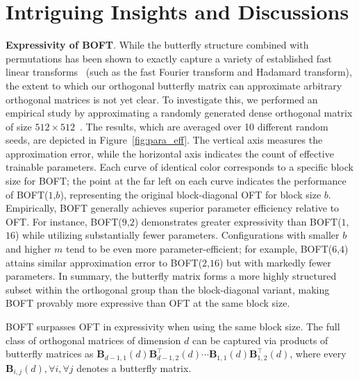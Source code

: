 \section{Intriguing Insights and Discussions}

\textbf{Expressivity of BOFT}. While the butterfly structure combined with permutations has been shown to exactly capture a variety of established fast linear transforms~\cite{dao2019learning,dao2019kaleidoscope} (such as the fast Fourier transform and Hadamard transform), the extent to which our orthogonal butterfly matrix can approximate arbitrary orthogonal matrices is not yet clear. To investigate this, we performed an empirical study by approximating a randomly generated dense orthogonal matrix of size $512\times 512$~\cite{anderson1987generation}. The results, which are averaged over 10 different random seeds, are depicted in Figure~\ref{fig:para_eff}. The vertical axis measures the approximation error, while the horizontal axis indicates the count of effective trainable parameters. Each curve of identical color corresponds to a specific block size for BOFT; the point at the far left on each curve indicates the performance of BOFT($1$,$b$), representing the original block-diagonal OFT for block size $b$. Empirically, BOFT generally achieves superior parameter efficiency relative to OFT. For instance, BOFT($9$,$2$) demonstrates greater expressivity than BOFT($1$,$16$) while utilizing substantially fewer parameters. Configurations with smaller $b$ and higher $m$ tend to be even more parameter-efficient; for example, BOFT($6$,$4$) attains similar approximation error to BOFT($2$,$16$) but with markedly fewer parameters. In summary, the butterfly matrix forms a more highly structured subset within the orthogonal group than the block-diagonal variant, making BOFT provably more expressive than OFT at the same block size.

\begin{theorem}\label{thm:exp_boft}
    BOFT surpasses OFT in expressivity when using the same block size. The full class of orthogonal matrices of dimension $d$ can be captured via products of butterfly matrices as $\bm{B}_{d-1,1}(d)\bm{B}^\top_{d-1,2}(d)\cdots\bm{B}_{1,1}(d)\bm{B}^\top_{1,2}(d)$, where every $\bm{B}_{i,j}(d),\forall i,\forall j$ denotes a butterfly matrix.
\end{theorem}

